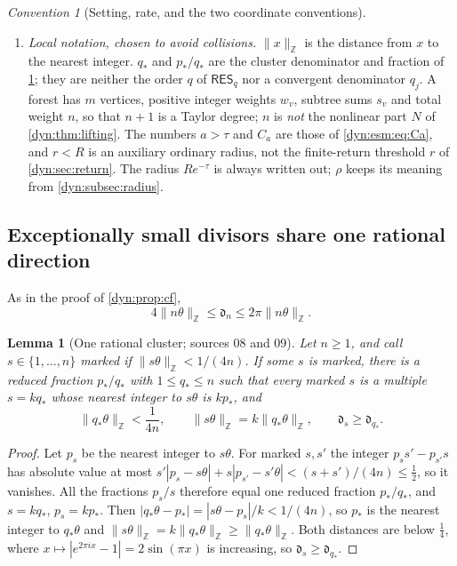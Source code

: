 \documentclass[11pt,letterpaper]{article}
\newtheorem{lemma}[lemma]{Lemma}
\theoremstyle{definition}
\theoremstyle{remark}
\newtheorem{convention}[convention]{Convention}
\newcommand{\Z}{\mathbb Z}
\newcommand{\resq}{\mathsf{RES}_q}
\numberwithin{equation}{section}
\begin{document}
\begin{convention}[Setting, rate, and the two coordinate conventions]
\begin{enumerate}[label=(\roman*)]
$\check h_\eta=-h_\eta$, and what it calls the linearizer is our $H^{-1}$.
\item \emph{Local notation, chosen to avoid collisions.} $\|x\|_{\Z}$ is
the distance from $x$ to the nearest integer. $q_*$ and $p_*/q_*$ are the
cluster denominator and fraction of \cref{dyn:esm:lem:cluster}; they are
neither the order $q$ of $\resq$ nor a convergent denominator $q_j$. A
forest has $m$ vertices, positive integer weights $w_v$, subtree sums
$s_v$ and total weight $n$, so that $n+1$ is a Taylor degree; $n$ is
\emph{not} the nonlinear part $N$ of \cref{dyn:thm:lifting}. The numbers
$a>\tau$ and $C_a$ are those of \eqref{dyn:esm:eq:Ca}, and $r<R$ is an
auxiliary ordinary radius, not the finite-return threshold $r$ of
\cref{dyn:sec:return}. The radius $Re^{-\tau}$ is always written out;
$\rho$ keeps its meaning from \cref{dyn:subsec:radius}.
\end{enumerate}
\end{convention}

\subsection{Exceptionally small divisors share one rational direction}
\label{dyn:esm:subsec:arith}

As in the proof of \cref{dyn:prop:cf},
\begin{equation}\label{dyn:esm:eq:sine}
 4\|n\theta\|_{\Z}\le\mathfrak d_n\le2\pi\|n\theta\|_{\Z}.
\end{equation}

\begin{lemma}[One rational cluster; sources 08 and 09]
\label{dyn:esm:lem:cluster}
Let $n\ge1$, and call $s\in\{1,\dots,n\}$ \emph{marked} if
$\|s\theta\|_{\Z}<1/(4n)$. If some $s$ is marked, there is a reduced
fraction $p_*/q_*$ with $1\le q_*\le n$ such that every marked $s$ is a
multiple $s=kq_*$ whose nearest integer to $s\theta$ is $kp_*$, and
\[
 \|q_*\theta\|_{\Z}<\frac1{4n},\qquad
 \|s\theta\|_{\Z}=k\|q_*\theta\|_{\Z},\qquad
 \mathfrak d_s\ge\mathfrak d_{q_*}.
\]
\end{lemma}
\begin{proof}
Let $p_s$ be the nearest integer to $s\theta$. For marked $s,s'$ the
integer $p_ss'-p_{s'}s$ has absolute value at most
$s'|p_s-s\theta|+s|p_{s'}-s'\theta|<(s+s')/(4n)\le\frac12$, so it vanishes.
All the fractions $p_s/s$ therefore equal one reduced fraction $p_*/q_*$,
and $s=kq_*$, $p_s=kp_*$. Then $|q_*\theta-p_*|=|s\theta-p_s|/k<1/(4n)$,
so $p_*$ is the nearest integer to $q_*\theta$ and
$\|s\theta\|_{\Z}=k\|q_*\theta\|_{\Z}\ge\|q_*\theta\|_{\Z}$. Both distances
are below $\frac14$, where $x\mapsto|e^{2\pi ix}-1|=2\sin(\pi x)$ is
increasing, so $\mathfrak d_s\ge\mathfrak d_{q_*}$.
\end{proof}
\end{document}

